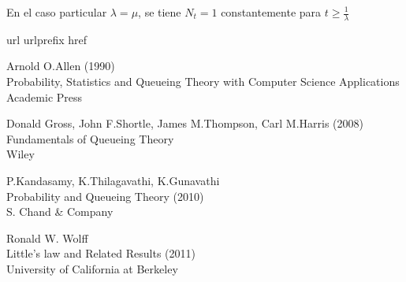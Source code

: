 \documentclass[a4paper,10pt]{scrartcl}
\theoremstyle{definition}
\numberwithin{equation}{section}
\begin{document}
En el caso particular $\lambda = \mu$, se tiene $N_t = 1$ constantemente para $t\ge \frac{1}{\lambda}$

\newpage
\begin{thebibliography}{10}
  \expandafter\ifx\csname url\endcsname\relax
  \def\url#1{\texttt{#1}}\fi
  \expandafter\ifx\csname urlprefix\endcsname\relax\def\urlprefix{URL }\fi
  \expandafter\ifx\csname href\endcsname\relax
  \def\href#1#2{#2} \def\path#1{#1}\fi

  Arnold O.Allen (1990)\\
  Probability, Statistics and Queueing Theory with Computer Science Applications\\
  Academic Press

  Donald Gross, John F.Shortle, James M.Thompson, Carl M.Harris (2008)\\
  Fundamentals of Queueing Theory\\
  Wiley
  
  P.Kandasamy, K.Thilagavathi, K.Gunavathi\\
  Probability and Queueing Theory (2010)\\
  S. Chand \& Company

  Ronald W. Wolff\\
  Little's law and Related Results (2011)\\
  University of California at Berkeley
\end{thebibliography}
\end{document}
